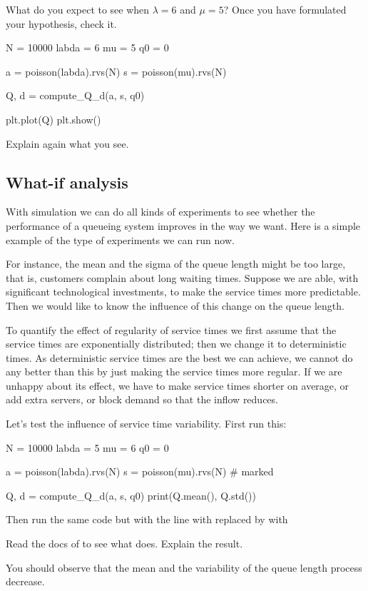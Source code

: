 \begin{exercise}
What do you expect to see when $\lambda=6$ and $\mu=5$? Once you have formulated your hypothesis, check it.

\begin{pyverbatim}
N = 10000
labda = 6
mu = 5
q0 = 0

a = poisson(labda).rvs(N)
s = poisson(mu).rvs(N)

Q, d = compute_Q_d(a, s, q0)

plt.plot(Q)
plt.show()
  \end{pyverbatim}
Explain again what you see.
\end{exercise}

\subsection{What-if analysis}
\label{sec:what-if-analysis}

With simulation we can do all kinds of experiments to see whether the performance of a queueing system improves in the way we want. Here is a simple example of the type of experiments we can run now. 

For instance,  the mean and the sigma of the queue length  might be too large, that is, customers complain about long waiting times.  Suppose we are able, with significant technological investments, to make the service times more predictable. Then we would like to know  the influence of this change on the queue length.

To quantify the effect of regularity of service times we first assume that the service times are exponentially distributed; then we change it to deterministic times.
As deterministic service times are the best we can achieve,  we cannot do any better than this by just making the service times more regular. If we are unhappy about its effect, we have to make service times shorter on average, or add extra servers, or block demand so that the inflow reduces. 

\begin{exercise}
Let's test the influence of service time variability. First run this:
\begin{pyverbatim}
N = 10000
labda = 5
mu = 6
q0 = 0

a = poisson(labda).rvs(N)
s = poisson(mu).rvs(N)  # marked

Q, d = compute_Q_d(a, s, q0)
print(Q.mean(), Q.std())
\end{pyverbatim}
Then run the same code but with the line with  replaced by with
\begin{pyverbatim}
\end{pyverbatim}
Read the docs of  to see what  does.  Explain the result.
\begin{solution}
	You should observe that the mean and the variability of the queue length process decrease.
\end{solution}
\end{exercise}



